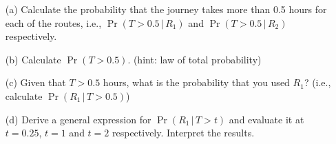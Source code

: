 \documentclass[]{report}
\begin{document}
\begin{itemize}
\item[(a)] Calculate the probability that the journey takes more than 0.5 hours for each of the routes, i.e., $\Pr(T > 0.5\,|\,R_1)$ and $\Pr(T > 0.5\,|\,R_2)$ respectively.  \item[(b)] Calculate $\Pr(T > 0.5)$. (hint: law of total probability)  \item[(c)] Given that $T>0.5$ hours, what is the probability that you used $R_1$? (i.e., calculate $\Pr(R_1\,|\,T>0.5)$)  \item[(d)] Derive a general expression for $\Pr(R_1\,|\,T>t)$ and evaluate it at $t=0.25$, $t = 1$ and $t = 2$ respectively. Interpret the results.
\end{itemize}
\end{document}

